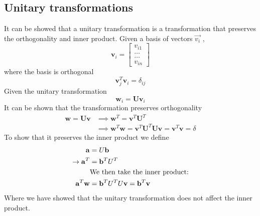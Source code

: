 \documentclass[%
reprint,
amsmath,amssymb,
aps,
]{revtex4-1}
\begin{document}
\subsection{Unitary transformations} \noindent 
It can be showed that a unitary transformation is a transformation that preserves the orthogonality and inner product. Given a basis of vectors $\vec{v_i}$ ,
\begin{equation*}
	\mathbf{v}_i = \begin{bmatrix} v_{i1} \\ \dots \\ \dots \\v_{in} \end{bmatrix}
\end{equation*}
where the basis is orthogonal 
\begin{equation*}
	\mathbf{v}_j^T\mathbf{v}_i = \delta_{ij}
\end{equation*}
Given the unitary transformation 
\begin{equation*}
	\mathbf{w}_i=\mathbf{U}\mathbf{v}_i
\end{equation*}
It can be shown that the transformation preserves orthogonality
\begin{align*}
	\mathbf{w}=\mathbf{U}\mathbf{v} &\implies \mathbf{w}^T=\mathbf{v}^T\mathbf{U}^T \\ &\implies \mathbf{w}^T\mathbf{w} = \mathbf{v}^T\mathbf{U}^T\mathbf{U}\mathbf{v} = \mathbf{v}^T\mathbf{v} = \delta
\end{align*}
To show that it preserves the inner product we define 
\begin{align*}
	\mathbf{a} &= U\mathbf{b} \\
	\rightarrow \mathbf{a}^T &= \mathbf{b}^TU^T \\
	&\textnormal{We then take the inner product:} \\
	 \mathbf{a}^T\mathbf{w} &= \mathbf{b}^TU^TU\mathbf{v} = \mathbf{b}^T\mathbf{v}
\end{align*}
Where we have showed that the unitary transformation does not affect the inner product. 
\end{document}
